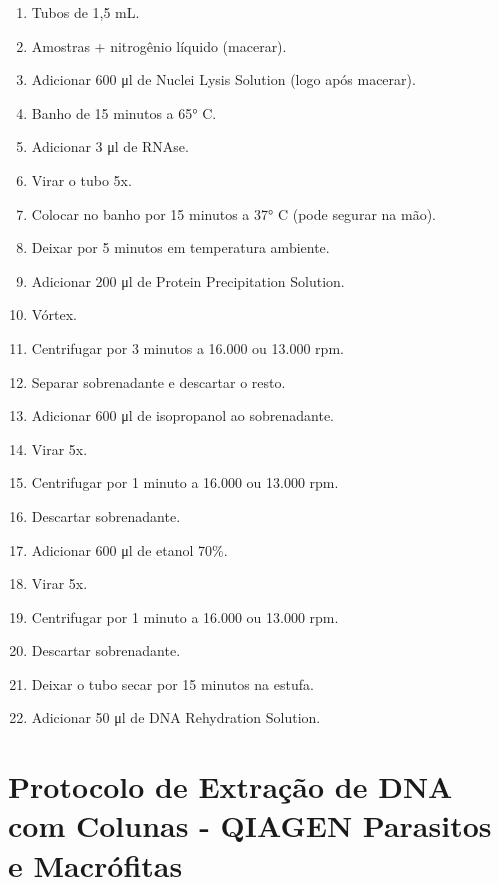 \documentclass[
  letterpaper,
  DIV=11,
  numbers=noendperiod]{scrreprt}
\begin{document}
\begin{enumerate}
\def\labelenumi{\arabic{enumi}.}
\item
  Tubos de 1,5 mL.
\item
  Amostras + nitrogênio líquido (macerar).
\item
  Adicionar 600 μl de Nuclei Lysis Solution (logo após macerar).
\item
  Banho de 15 minutos a 65° C.
\item
  Adicionar 3 μl de RNAse.
\item
  Virar o tubo 5x.
\item
  Colocar no banho por 15 minutos a 37° C (pode segurar na mão).
\item
  Deixar por 5 minutos em temperatura ambiente.
\item
  Adicionar 200 μl de Protein Precipitation Solution.
\item
  Vórtex.
\item
  Centrifugar por 3 minutos a 16.000 ou 13.000 rpm.
\item
  Separar sobrenadante e descartar o resto.
\item
  Adicionar 600 μl de isopropanol ao sobrenadante.
\item
  Virar 5x.
\item
  Centrifugar por 1 minuto a 16.000 ou 13.000 rpm.
\item
  Descartar sobrenadante.
\item
  Adicionar 600 μl de etanol 70\%.
\item
  Virar 5x.
\item
  Centrifugar por 1 minuto a 16.000 ou 13.000 rpm.
\item
  Descartar sobrenadante.
\item
  Deixar o tubo secar por 15 minutos na estufa.
\item
  Adicionar 50 μl de DNA Rehydration Solution.
\end{enumerate}

\hypertarget{protocolo-de-extrauxe7uxe3o-de-dna-com-colunas---qiagen-parasitos-e-macruxf3fitas}{%
\section{\texorpdfstring{Protocolo de Extração de DNA com Colunas -
QIAGEN \textbf{Parasitos e
Macrófitas}}{Protocolo de Extração de DNA com Colunas - QIAGEN Parasitos e Macrófitas}}\label{protocolo-de-extrauxe7uxe3o-de-dna-com-colunas---qiagen-parasitos-e-macruxf3fitas}}
\end{document}
